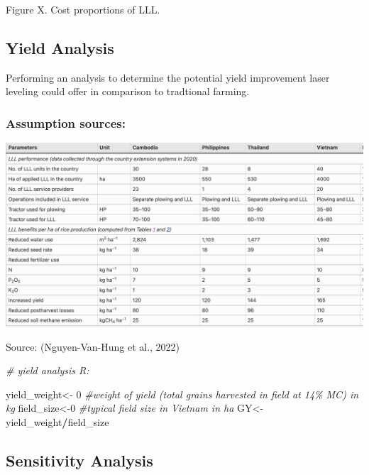\documentclass[
]{article}
\newenvironment{Shaded}{\begin{snugshade}}{\end{snugshade}}
\newcommand{\CommentTok}[1]{\textcolor[rgb]{0.56,0.35,0.01}{\textit{#1}}}
\newcommand{\DecValTok}[1]{\textcolor[rgb]{0.00,0.00,0.81}{#1}}
\newcommand{\NormalTok}[1]{#1}
\newcommand{\OtherTok}[1]{\textcolor[rgb]{0.56,0.35,0.01}{#1}}
\newcommand{\SpecialCharTok}[1]{\textcolor[rgb]{0.81,0.36,0.00}{\textbf{#1}}}
\begin{document}
Figure X. Cost proportions of LLL.

\hypertarget{yield-analysis}{%
\subsection{Yield Analysis}\label{yield-analysis}}

Performing an analysis to determine the potential yield improvement
laser leveling could offer in comparison to tradtional farming.

\hypertarget{assumption-sources}{%
\subsubsection{Assumption sources:}\label{assumption-sources}}

\includegraphics{images/Screenshot 2023-06-12 at 9.38.09 PM.png}

Source: (Nguyen-Van-Hung et al., 2022)

\begin{Shaded}
\begin{Highlighting}[]
\CommentTok{\# yield analysis R:}

\NormalTok{yield\_weight}\OtherTok{\textless{}{-}} \DecValTok{0} \CommentTok{\#weight of yield (total grains harvested in field at 14\% MC) in kg}
\NormalTok{field\_size}\OtherTok{\textless{}{-}}\DecValTok{0}  \CommentTok{\#typical field size in Vietnam in ha}
\NormalTok{GY}\OtherTok{\textless{}{-}}\NormalTok{ yield\_weight}\SpecialCharTok{/}\NormalTok{field\_size}
\end{Highlighting}
\end{Shaded}

\hypertarget{sensitivity-analysis}{%
\subsection{Sensitivity Analysis}\label{sensitivity-analysis}}
\end{document}

